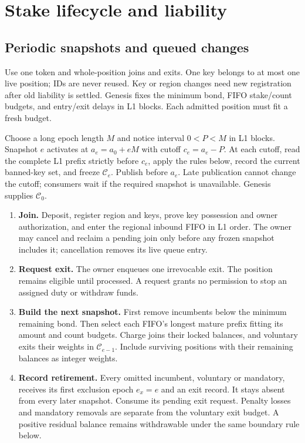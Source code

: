\documentclass[11pt,a4paper]{article}
\newcommand{\cfg}{\mathcal C}
\begin{document}
\newpage
\section{Stake lifecycle and liability}
\label{sec:stake}
\subsection{Periodic snapshots and queued changes}
Use one token and whole-position joins and exits. One key belongs to at
most one live position; IDs are never reused. Key or region changes need
new registration after old liability is settled. Genesis fixes the
minimum bond, FIFO stake/count budgets, and entry/exit delays in L1 blocks.
Each admitted position must fit a fresh budget.

Choose a long epoch length $M$ and notice interval $0<P<M$ in L1 blocks.
Snapshot $e$ activates at $a_e=a_0+eM$ with cutoff $c_e=a_e-P$.
At each cutoff, read the complete L1 prefix strictly before $c_e$, apply
the rules below, record the current banned-key set, and freeze $\cfg_e$.
Publish before $a_e$. Late publication cannot change the cutoff; consumers
wait if the required snapshot is unavailable. Genesis supplies $\cfg_0$.

\begin{enumerate}[label=\textbf{\arabic*.},itemsep=3pt]
\item \textbf{Join.} Deposit, register region and keys, prove key possession
and owner authorization, and enter the regional inbound FIFO in L1 order.
The owner may cancel and reclaim a pending join only before any frozen
snapshot includes it; cancellation removes its live queue entry.
\item \textbf{Request exit.} The owner enqueues one irrevocable exit.
The position remains eligible until processed. A request grants no
permission to stop an assigned duty or withdraw funds.
\item \textbf{Build the next snapshot.} First remove incumbents below
the minimum remaining bond. Then select each FIFO's longest mature prefix
fitting its amount and count budgets. Charge joins their locked balances,
and voluntary exits their weights in $\cfg_{e-1}$. Include surviving
positions with their remaining balances as integer weights.
\item \textbf{Record retirement.} Every omitted incumbent, voluntary or
mandatory, receives its first exclusion epoch $e_x=e$ and an exit record.
It stays absent from every later snapshot. Consume its pending exit
request. Penalty losses and mandatory removals are separate from the
voluntary exit budget. A positive residual balance remains withdrawable
under the same boundary rule below.
\end{enumerate}
\end{document}
